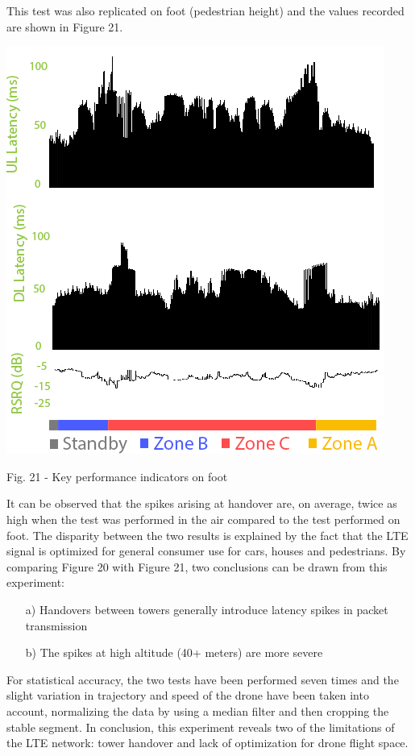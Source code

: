 \documentclass{IEEEtran}
\begin{document}
\newline
\newline
This test was also replicated on foot (pedestrian height) and the values recorded are shown in Figure 21.
\begin{center}\includegraphics[scale=.90]{kpi_on_foot.png}\end{center}
\begin{it}\begin{center}Fig. 21 - Key performance indicators on foot \end{center}\end{it}
It can be observed that the spikes arising at handover are, on average, twice as high when the test was performed in the air compared to the test performed on foot. 
The disparity between the two results is explained by the fact that the LTE signal is optimized for general consumer use for cars, houses and pedestrians.
\newline
\newline
By comparing Figure 20 with Figure 21, two conclusions can be drawn from this experiment:
\begin{itemize}
    \item [a)] Handovers between towers generally introduce latency spikes in packet transmission
    \item [b)] The spikes at high altitude (40+ meters) are more severe
\end{itemize}
For statistical accuracy, the two tests have been performed seven times and the slight variation in trajectory and speed of the drone have been taken into account, normalizing the data by using a median filter and then cropping the stable segment.
In conclusion, this experiment reveals two of the limitations of the LTE network: tower handover and lack of optimization for drone flight space.
\end{document}
